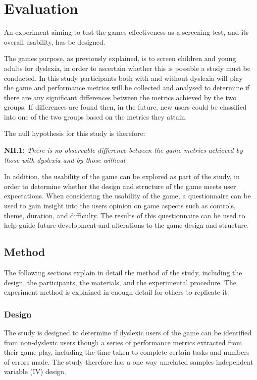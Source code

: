 \documentclass[journal]{IEEEtran}
\begin{document}
\section{Evaluation}
\label{sec:evaluation}
An experiment aiming to test the games effectiveness as a screening test, and its overall usability, has be designed. 

The games purpose, as previously explained, is to screen children and young adults for dyslexia, in order to ascertain whether this is possible a study must be conducted. In this study participants both with and without dyslexia will play the game and performance metrics will be collected and analysed to determine if there are any significant differences between the metrics achieved by the two groups. If differences are found then, in the future, new users could be classified into one of the two groups based on the metrics they attain.

The null hypothesis for this study is therefore:
\begin{center}
\textbf{NH.1:} \textit{There is no observable difference between the game metrics achieved by those with dyslexia and by those without}
\end{center}

In addition, the usability of the game can be explored as part of the study, in order to determine whether the design and structure of the game meets user expectations. When considering the usability of the game, a questionnaire can be used to gain insight into the users opinion on game aspects such as controls, theme, duration, and difficulty. The results of this questionnaire can be used to help guide future development and alterations to the game design and structure.

\subsection{Method}
The following sections explain in detail the method of the study, including the design, the participants, the materials, and the experimental procedure. The experiment method is explained in enough detail for others to replicate it. 

\subsubsection{Design}
The study is designed to determine if dyslexic users of the game can be identified from non-dyslexic users though a series of performance metrics extracted from their game play, including the time taken to complete certain tasks and numbers of errors made. The study therefore has a one way unrelated samples independent variable (IV) design.
\end{document}
